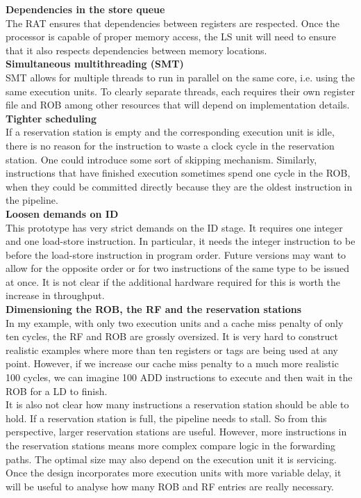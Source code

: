 \documentclass[12pt,a4paper]{article} %
\begin{document}
\textbf{Dependencies in the store queue}\\
	The RAT ensures that dependencies between registers are respected. Once the processor is capable of proper memory access, the LS unit will need to ensure that it also respects dependencies between memory locations.\\

\textbf{Simultaneous multithreading (SMT)}\\
	SMT allows for multiple threads to run in parallel on the same core, i.e. using the same execution units. To clearly separate threads, each requires their own register file and ROB among other resources that will depend on implementation details. \cite[p.~584-599]{lipastiShen}\\

\textbf{Tighter scheduling}\\
	If a reservation station is empty and the corresponding execution unit is idle, there is no reason for the instruction to waste a clock cycle in the reservation station. One could introduce some sort of skipping mechanism. Similarly, instructions that have finished execution sometimes spend one cycle in the ROB, when they could be committed directly because they are the oldest instruction in the pipeline.\\
	
\textbf{Loosen demands on ID}\\
	This prototype has very strict demands on the ID stage. It requires one integer and one load-store instruction. In particular, it needs the integer instruction to be before the load-store instruction in program order. Future versions may want to allow for the opposite order or for two instructions of the same type to be issued at once. It is not clear if the additional hardware required for this is worth the increase in throughput.\\
	
\textbf{Dimensioning the ROB, the RF and the reservation stations}\\
	In my example, with only two execution units and a cache miss penalty of only ten cycles, the RF and ROB are grossly oversized. It is very hard to construct realistic examples where more than ten registers or tags are being used at any point. However, if we increase our cache miss penalty to a much more realistic 100 cycles, we can imagine 100 ADD instructions to execute and then wait in the ROB for a LD to finish. \\
	It is also not clear how many instructions a reservation station should be able to hold. If a reservation station is full, the pipeline needs to stall. So from this perspective, larger reservation stations are useful. However, more instructions in the reservation stations means more complex compare logic in the forwarding paths. The optimal size may also depend on the execution unit it is servicing.\\
	Once the design incorporates more execution units with more variable delay, it will be useful to analyse how many ROB and RF entries are really necessary.\\
\end{document}
